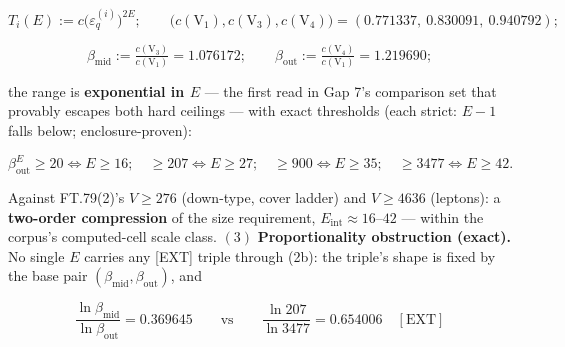 \begin{theorem}
\[
T_i(E):=c\bigl(\varepsilon_q^{(i)}\bigr)^{2E};\qquad \bigl(c(\mathrm V_1),c(\mathrm V_3),c(\mathrm V_4)\bigr)=(0.771337,\ 0.830091,\ 0.940792);
\]

\[
\beta_{\mathrm{mid}}:=\tfrac{c(\mathrm V_3)}{c(\mathrm V_1)}=1.076172;\qquad \beta_{\mathrm{out}}:=\tfrac{c(\mathrm V_4)}{c(\mathrm V_1)}=1.219690;
\]

the range is \textbf{exponential in $E$} — the first read in Gap 7's comparison set that provably escapes both hard ceilings — with exact thresholds (each strict: $E{-}1$ falls below; enclosure-proven):

\[
\beta_{\mathrm{out}}^E\ge20\iff E\ge16;\quad \ge207\iff E\ge27;\quad \ge900\iff E\ge35;\quad \ge3477\iff E\ge42.
\]

Against FT.79(2)'s $V\ge276$ (down-type, cover ladder) and $V\ge4636$ (leptons): a \textbf{two-order compression} of the size requirement, $E_{\mathrm{int}}\approx16$–$42$ — within the corpus's computed-cell scale class. $(3)$ \textbf{Proportionality obstruction (exact).} No single $E$ carries any [EXT] triple through (2b): the triple's shape is fixed by the base pair $(\beta_{\mathrm{mid}},\beta_{\mathrm{out}})$, and

\[
\frac{\ln\beta_{\mathrm{mid}}}{\ln\beta_{\mathrm{out}}}=0.369645\qquad\text{vs}\qquad\frac{\ln207}{\ln3477}=0.654006\quad[\mathrm{EXT}]
\]


\end{theorem}

